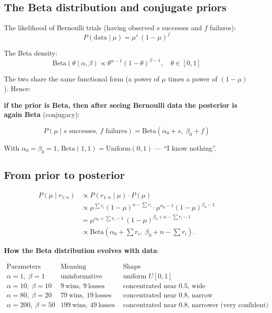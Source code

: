\documentclass{article}
\begin{document}
\subsection*{The Beta distribution and conjugate priors}

The likelihood of Bernoulli trials (having observed $s$ successes and $f$ failures):
\[
P(\text{data} \mid \mu) = \mu^{s}\,(1-\mu)^{f}
\]

The Beta density:
\[
\text{Beta}(\theta \mid \alpha, \beta) \propto \theta^{\alpha-1}(1-\theta)^{\beta-1}, \quad \theta \in [0,1]
\]

The two share the same functional form (a power of $\mu$ times a power of $(1-\mu)$). Hence:

\textbf{if the prior is Beta, then after seeing Bernoulli data the posterior is again Beta} (conjugacy):

\[
\boxed{P(\mu \mid s \text{ successes, } f \text{ failures}) = \text{Beta}(\alpha_0 + s,\; \beta_0 + f)}
\]

With $\alpha_0 = \beta_0 = 1$, $\text{Beta}(1,1) = \text{Uniform}(0,1)$ --- ``I know nothing''.

\subsection*{From prior to posterior}

\[
\begin{aligned}
P(\mu \mid r_{1:n}) &\propto P(r_{1:n} \mid \mu) \cdot P(\mu)  \\
&\propto \mu^{\sum r_i} (1-\mu)^{n-\sum r_i} \cdot \mu^{\alpha_0-1} (1-\mu)^{\beta_0-1} \\
&= \mu^{\alpha_0 + \sum r_i - 1}\,(1-\mu)^{\beta_0 + n - \sum r_i - 1} \\
&\propto \text{Beta}\left(\alpha_0 + \sum r_i,\; \beta_0 + n - \sum r_i\right).
\end{aligned}
\]

\textbf{How the Beta distribution evolves with data}:

\[
\begin{array}{c|c|c}
\text{Parameters} & \text{Meaning} & \text{Shape} \\
\hline
\alpha=1,\;\beta=1     & \text{uninformative prior} & \text{uniform } U[0,1] \\
\alpha=10,\;\beta=10   & 9\ \text{wins},\ 9\ \text{losses} & \text{concentrated near } 0.5 \text{, wide} \\
\alpha=80,\;\beta=20   & 79\ \text{wins},\ 19\ \text{losses} & \text{concentrated near } 0.8 \text{, narrow} \\
\alpha=200,\;\beta=50  & 199\ \text{wins},\ 49\ \text{losses} & \text{concentrated near } 0.8 \text{, narrower (very confident)} \\
\end{array}
\]
\end{document}
